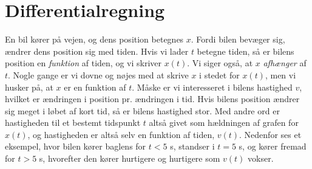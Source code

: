 \section{Differentialregning}
En bil kører på vejen, og dens position betegnes $x$. Fordi bilen
bevæger sig, ændrer dens position sig med tiden. Hvis vi lader $t$
betegne tiden, så er bilens position en \emph{funktion} af tiden, og
vi skriver $x(t)$. Vi siger også, at $x$ \emph{afhænger} af $t$. Nogle
gange er vi dovne og nøjes med at skrive $x$ i stedet for $x(t)$, men
vi husker på, at $x$ er en funktion af $t$. Måske er vi interesseret i
bilens hastighed $v$, hvilket er ændringen i position pr. ændringen i
tid. Hvis bilens position ændrer sig meget i løbet af kort tid, så er
bilens hastighed stor. Med andre ord er hastigheden til et bestemt
tidspunkt $t$ altså givet som hældningen af grafen for $x(t)$, og
hastigheden er altså selv en funktion af tiden, $v(t)$. Nedenfor ses
et eksempel, hvor bilen kører baglens for $t<5$ s, standser i $t=5$ s,
og kører fremad for $t>5$ s, hvorefter den kører hurtigere og
hurtigere som $v(t)$ vokser.

\begin{center}
\end{center}

